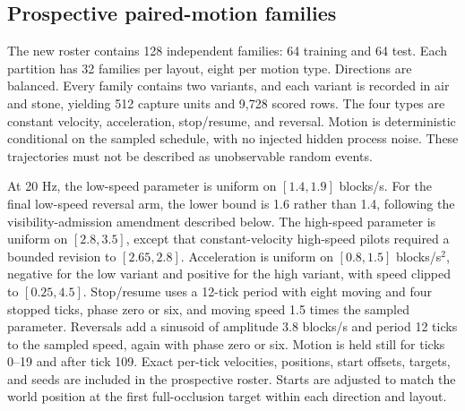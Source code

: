 \subsection{Prospective paired-motion families}
The new roster contains 128 independent families: 64 training and 64 test.
Each partition has 32 families per layout, eight per motion type. Directions are
balanced. Every family contains two variants, and each variant is recorded in
air and stone, yielding 512 capture units and 9,728 scored rows. The four types
are constant velocity, acceleration, stop/resume, and reversal. Motion is
deterministic conditional on the sampled schedule, with no injected hidden process
noise. These trajectories must not be described as unobservable random events.

At 20 Hz, the low-speed parameter is uniform on $[1.4,1.9]$ blocks/s.
For the final low-speed reversal arm, the lower bound is 1.6 rather than 1.4,
following the visibility-admission amendment described below. The
high-speed parameter is uniform on $[2.8,3.5]$, except that constant-velocity
high-speed pilots required a bounded revision to $[2.65,2.8]$. Acceleration is
uniform on $[0.8,1.5]$ blocks/s$^2$, negative for the low variant and positive for
the high variant, with speed clipped to $[0.25,4.5]$. Stop/resume uses a 12-tick
period with eight moving and four stopped ticks, phase zero or six, and moving
speed 1.5 times the sampled parameter. Reversals add a sinusoid of amplitude
3.8 blocks/s and period 12 ticks to the sampled speed, again with phase zero or
six. Motion is held still for ticks 0--19 and after tick 109. Exact per-tick
velocities, positions, start offsets, targets, and seeds are included in the
prospective roster. Starts are adjusted to match the world position at the first
full-occlusion target within each direction and layout.

